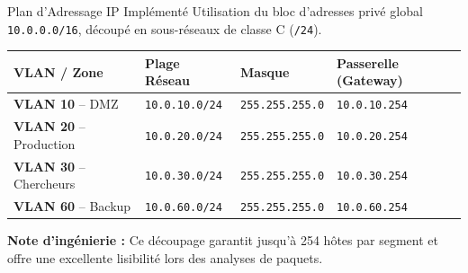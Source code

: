 \begin{frame}{Plan d'Adressage IP Implémenté}
    Utilisation du bloc d'adresses privé global \texttt{10.0.0.0/16}, découpé en sous-réseaux de classe C (\texttt{/24}).

    \vspace{0.2cm}
    \centering
    \small
    \begin{tabular}{llll}
        \toprule
        \textbf{VLAN / Zone} & \textbf{Plage Réseau} & \textbf{Masque} & \textbf{Passerelle (Gateway)} \\
        \midrule
        \textbf{VLAN 10} -- DMZ & \texttt{10.0.10.0/24} & \texttt{255.255.255.0} & \texttt{10.0.10.254} \\
        \textbf{VLAN 20} -- Production & \texttt{10.0.20.0/24} & \texttt{255.255.255.0} & \texttt{10.0.20.254} \\
        \textbf{VLAN 30} -- Chercheurs & \texttt{10.0.30.0/24} & \texttt{255.255.255.0} & \texttt{10.0.30.254} \\
        \textbf{VLAN 60} -- Backup & \texttt{10.0.60.0/24} & \texttt{255.255.255.0} & \texttt{10.0.60.254} \\
        \bottomrule
    \end{tabular}
    
    \vspace{0.3cm}
    \flushleft
    \footnotesize{\textbf{Note d'ingénierie :} Ce découpage garantit jusqu'à 254 hôtes par segment et offre une excellente lisibilité lors des analyses de paquets.}
\end{frame}

